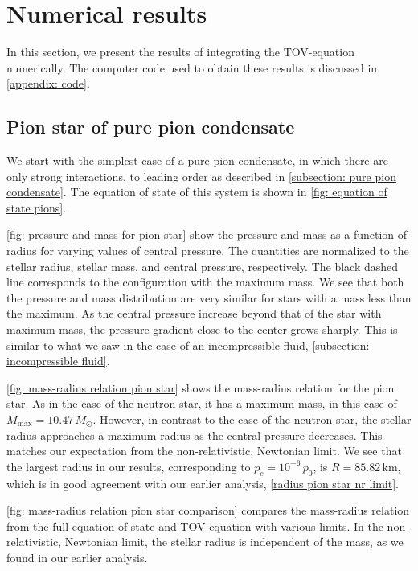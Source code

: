 \section{Numerical results}

In this section, we present the results of integrating the TOV-equation numerically.
The computer code used to obtain these results is discussed in \autoref{appendix: code}.

\subsection{Pion star of pure pion condensate}


We start with the simplest case of a pure pion condensate, in which there are only strong interactions, to leading order as described in \autoref{subsection: pure pion condensate}.
The equation of state of this system is shown in \autoref{fig: equation of state pions}.

\autoref{fig: pressure and mass for pion star} show the pressure and mass as a function of radius for varying values of central pressure.
The quantities are normalized to the stellar radius, stellar mass, and central pressure, respectively.
The black dashed line corresponds to the configuration with the maximum mass.
We see that both the pressure and mass distribution are very similar for stars with a mass less than the maximum.
As the central pressure increase beyond that of the star with maximum mass, the pressure gradient close to the center grows sharply.
This is similar to what we saw in the case of an incompressible fluid, \autoref{subsection: incompressible fluid}.

\autoref{fig: mass-radius relation pion star} shows the mass-radius relation for the pion star.
As in the case of the neutron star, it has a maximum mass, in this case of $M_\text{max} = 10.47\, M_\odot$.
However, in contrast to the case of the neutron star, the stellar radius approaches a maximum radius as the central pressure decreases.
This matches our expectation from the non-relativistic, Newtonian limit.
We see that the largest radius in our results, corresponding to  $p_c = 10^{-6} \, p_0$, is $R = 85.82 \, \text{km}$, which is in good agreement with our earlier analysis, \autoref{radius pion star nr limit}.

\autoref{fig: mass-radius relation pion star comparison} compares the mass-radius relation from the full equation of state and TOV equation with various limits.
In the non-relativistic, Newtonian limit, the stellar radius is independent of the mass, as we found in our earlier analysis.


